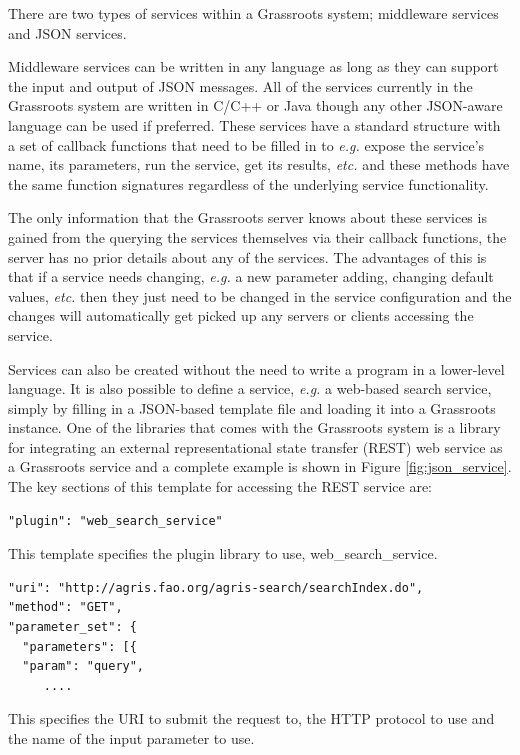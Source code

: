 \documentclass[9pt,a4paper]{extarticle}
\begin{document}
There are two types of services within a Grassroots system; middleware services and JSON services.

Middleware services can be written in any language as long as they can support the input and output of JSON messages. 
All of the services currently in the Grassroots system are written in C/C++ or Java though any other JSON-aware language can be used if preferred. 
These services have a standard structure with a set of callback functions that need to be filled in to \textit{e.g.} expose the service's name, its parameters, run the service, get its results, \textit{etc.} and these methods have the same function signatures regardless of the underlying service functionality. 

The only information that the Grassroots server knows about these services is gained from the querying the services themselves via their callback functions, the server has no prior details about any of the services. 
The advantages of this is that if a service needs changing, \textit{e.g.} a new parameter adding, changing default values, \textit{etc.} then they just need to be changed in the service configuration and the changes will automatically get picked up any servers or clients accessing the service. 

Services can also be created without the need to write a program in a lower-level language. 
It is also possible to define a service, \textit{e.g.} a web-based search service, simply by filling in a JSON-based template file and loading it into a Grassroots instance. 
One of the libraries that comes with the Grassroots system is a library for integrating an external representational state transfer (REST) web service as a Grassroots service and a complete example is shown in Figure \ref{fig:json_service}. 
The key sections of this template for accessing the REST service are:

\begin{lstlisting}[style=json]
"plugin": "web_search_service"
\end{lstlisting}
This template specifies the plugin library to use, web\_search\_service.

\begin{lstlisting}[style=json]
"uri": "http://agris.fao.org/agris-search/searchIndex.do",
"method": "GET",
"parameter_set": {
  "parameters": [{
  "param": "query",
     ....
\end{lstlisting}
This specifies the URI to submit the request to, the HTTP protocol to use and the name of the input parameter to use.
\end{document}
